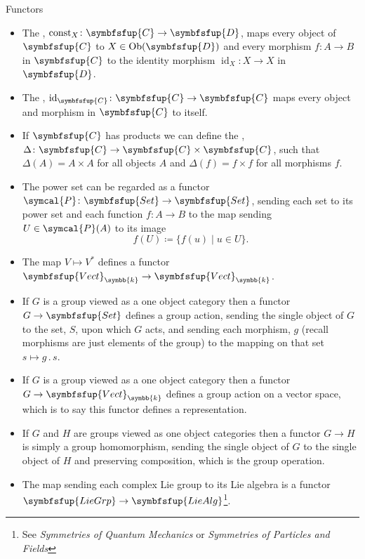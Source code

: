 \documentclass[fleqn]{NotesClass}
\makeatletter
\newcommand*{\course}[1]{\textit{#1}}
\newcommand{\cat}[1]{\symbfsfup{#1}}
\newcommand{\c@egory}[1]{\symbfsfup{#1}}
\newcommand{\Set}{\c@egory{Set}}
\renewcommand{\field}{\symbb{k}}
\newcommand{\Vect}[1][\field]{{\c@egory{Vect}_{#1}}}
\newcommand{\LieGrp}{\c@egory{LieGrp}}
\newcommand{\LieAlg}{\c@egory{LieAlg}}
\DeclareMathOperator{\Ob}{Ob}
\DeclareMathOperator{\id}{id}
\newcommand{\powerset}{\symcal{P}}
\newcommand{\const}{\mathrm{const}}
\makeatother
\begin{document}
    \begin{exm}{Functors}{}
        \begin{itemize}
            \item The , \(\const_X \colon \cat{C} \to \cat{D}\), maps every object of \(\cat{C}\) to \(X \in \Ob(\cat{D})\) and every morphism \(f \colon A \to B\) in \(\cat{C}\) to the identity morphism \(\id_X \colon X \to X\) in \(\cat{D}\).
            \item The , \(\id_{\cat{C}} \colon \cat{C} \to \cat{C}\) maps every object and morphism in \(\cat{C}\) to itself.
            \item If \(\cat{C}\) has products we can define the , \(\Delta \colon \cat{C} \to \cat{C} \times \cat{C}\), such that \(\Delta(A) = A \times A\) for all objects \(A\) and \(\Delta(f) = f \times f\) for all morphisms \(f\).
            \item The power set can be regarded as a functor \(\powerset\colon \Set \to \Set\), sending each set to its power set and each function \(f \colon A \to B\) to the map sending \(U \in \powerset(A)\) to its image
            \begin{equation}
                f(U) \coloneqq \{f(u) \mid u \in U\}.
            \end{equation}
            \item The map \(V \mapsto V^*\) defines a functor \(\Vect \to \Vect\).
            \item If \(G\) is a group viewed as a one object category then a functor \(G \to \Set\) defines a group action, sending the single object of \(G\) to the set, \(S\), upon which \(G\) acts, and sending each morphism, \(g\) (recall morphisms are just elements of the group) to the mapping on that set \(s \mapsto g \mathbin{.} s\).
            \item If \(G\) is a group viewed as a one object category then a functor \(G \to \Vect\) defines a group action on a vector space, which is to say this functor defines a representation.
            \item If \(G\) and \(H\) are groups viewed as one object categories then a functor \(G \to H\) is simply a group homomorphism, sending the single object of \(G\) to the single object of \(H\) and preserving composition, which is the group operation.
            \item The map sending each complex Lie group to its Lie algebra is a functor \(\LieGrp \to \LieAlg\)\footnote{See \course{Symmetries of Quantum Mechanics} or \course{Symmetries of Particles and Fields}}.

\end{itemize}
\end{exm}
\end{document}
